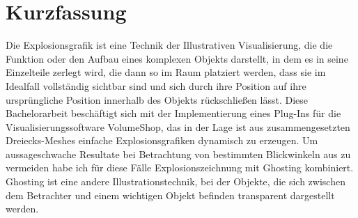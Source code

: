 %
%
%
%
%
%


\chapter*{Kurzfassung}

Die Explosionsgrafik ist eine Technik der Illustrativen Visualisierung, die die Funktion oder den Aufbau eines komplexen Objekts darstellt, in dem es in seine Einzelteile zerlegt wird, die dann so im Raum platziert werden, dass sie im Idealfall vollständig sichtbar sind und sich durch ihre Position auf ihre ursprüngliche Position innerhalb des Objekts rückschließen lässt. Diese Bachelorarbeit beschäftigt sich mit der Implementierung eines Plug-Ins für die Visualisierungssoftware VolumeShop, das in der Lage ist aus zusammengesetzten Dreiecks-Meshes einfache Explosionsgrafiken dynamisch zu erzeugen. Um aussageschwache Resultate bei Betrachtung von bestimmten Blickwinkeln aus zu vermeiden habe ich für diese Fälle Explosionszeichnung mit Ghosting kombiniert. Ghosting ist eine andere Illustrationstechnik, bei der Objekte, die sich zwischen dem Betrachter und einem wichtigen Objekt befinden transparent dargestellt werden.